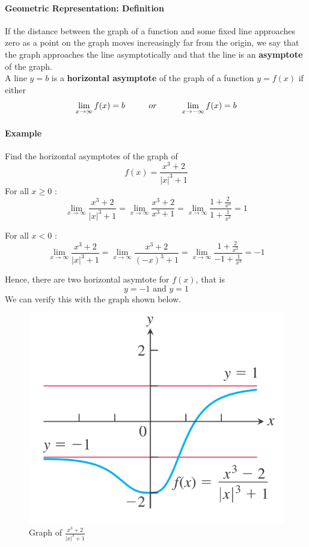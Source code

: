 \documentclass[12pt]{article}
\newcommand\tab[1][1cm]{\hspace*{#1}}
\begin{document}
\paragraph{Geometric Representation: Definition} If the distance between the graph of a function and some fixed line approaches zero as a
point on the graph moves increasingly far from the origin, we say that the graph approaches
the line asymptotically and that the line is an \textbf{asymptote} of the graph. \\

\noindent
A line $y = b$ is a \textbf{horizontal asymptote} of the graph of a function $y = f(x)$ if either
\[
    \lim_{x \to \infty} f(x) = b \textrm{\tab} or \textrm{\tab} \lim_{x \to - \infty} f(x) = b
\]

\paragraph{Example} Find the horizontal asymptotes of the graph of
\[
    f(x) = \frac{x^3 + 2}{|x|^3 + 1} 
\]
\noindent
For all $x \geq 0$ :
\[
    \lim_{x \to \infty} \frac{x^3 + 2}{|x|^3 + 1} = \lim_{x \to \infty} \frac{x^3 + 2}{x^3 + 1} = \lim_{x \to \infty} \frac{1 + \frac{2}{x^3}}{1 + \frac{1}{x^3}} = 1
\]

\noindent
For all $x < 0$ :
\[
    \lim_{x \to \infty} \frac{x^3 + 2}{|x|^3 + 1} = \lim_{x \to \infty} \frac{x^3 + 2}{(-x)^3 + 1} = \lim_{x \to \infty} \frac{1 + \frac{2}{x^3}}{ - 1 + \frac{1}{x^3}} = - 1
\]

Hence, there are two horizontal asymtote for $f(x)$, that is  \\
\[
    y = -1 \textrm{ and } y = 1
\]
We can verify this with the graph shown below.

\begin{figure}[h!]
    \centering
     \includegraphics[width = 0.4\linewidth]{Images/infty limit.png}
     \caption{Graph of $\frac{x^3 + 2}{|x|^3 + 1}$}
\end{figure}
\end{document}
